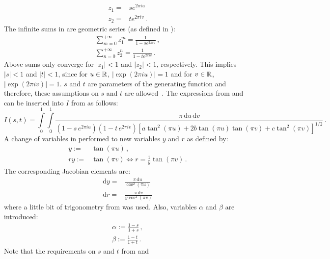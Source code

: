 \begin{align}
 z_1 =& s e^{2 \pi i u} \\
 z_2 =& t e^{2 \pi i v} \, .
\end{align}
The infinite sums in  are geometric series (as defined in ):
\begin{align}
    \sum\limits_{m=0}^{+\infty} z_1^m
  = \frac{1}{1 - s e^{2 \pi i u}} \, , \label{eqn:geom_series_s} \\
    \sum\limits_{n=0}^{+\infty} z_2^n
  = \frac{1}{1 - t e^{2 \pi i v}} \, . \label{eqn:geom_series_t}
\end{align}
Above sums only converge for $|z_1|<1$ and $|z_2|<1$, respectively.
This implies $|s|<1$ and $|t|<1$, since for $u\in\mathbb{R}$, $|\exp \left(2 \pi i u \right)|=1$
and for $v\in\mathbb{R}$, $|\exp \left(2 \pi i v \right)|=1$.
$s$ and $t$ are parameters of the generating function and therefore, these assumptions on $s$ and $t$ are allowed~\cite{discrete_mathematics}.
The expressions from  and  can be inserted into $I$ from  as follows:
\begin{equation}
  I(s,t) = \int\limits_0^1 \int\limits_0^1
       \frac{\pi \,\mathrm{d}u \,\mathrm{d}v}
            {\left(1 - s \, e^{2 \pi i u} \right)
             \left(1 - t \, e^{2 \pi i v} \right)
             \left[ a \tan^2(\pi u) + 2 b \tan(\pi u) \tan(\pi v) + c \tan^2(\pi v) \right]^{1/2} } \, . \label{eqn:int_I}
\end{equation}
A change of variables in performed to new variables $y$ and $r$ as defined by:
\begin{align}
  y  :=& \tan(\pi u) \, , \\
  ry :=& \tan(\pi v) \Leftrightarrow r = \frac{1}{y} \tan(\pi v) \, .
\end{align}
The corresponding Jacobian elements are:
\begin{align}
  \mathrm{d}y =& \frac{\pi\,\mathrm{d}u}{  \cos^2(\pi u)} \\
  \mathrm{d}r =& \frac{\pi\,\mathrm{d}v}{y \cos^2(\pi v)}
\end{align}
where a little bit of trigonometry from  was used.
Also, variables $\alpha$ and $\beta$ are introduced:
\begin{align}
  \alpha := \frac{1-s}{1+s} \, , \\
  \beta  := \frac{1-t}{1+t} \, .
\end{align}
Note that the requirements on $s$ and $t$ from  and 

